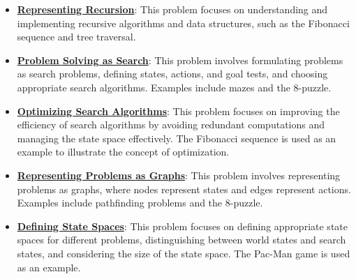 \documentclass{article}%
\begin{document}
\begin{itemize}[leftmargin=*]%
\item \href{https://purdue.brightspace.com/d2l/common/assets/pdfjs-d2l-dist/1.0.14-legacy/web/viewer.html?file=%2Fcontent%2Fenforced%2F1095467-wl.202510.CS.24300.001%2F14L1-DepthFS.pdf%3Fou%3D1095467&lang=en-us&container=d2l-fileviewer-rendered-pdf&fullscreen=d2l-fileviewer-rendered-pdf-dialog&height=667#page=3}{\textbf{Representing Recursion}}: This problem focuses on understanding and implementing recursive algorithms and data structures, such as the Fibonacci sequence and tree traversal.%
\item \href{https://purdue.brightspace.com/d2l/common/assets/pdfjs-d2l-dist/1.0.14-legacy/web/viewer.html?file=%2Fcontent%2Fenforced%2F1095467-wl.202510.CS.24300.001%2F14L1-DepthFS.pdf%3Fou%3D1095467&lang=en-us&container=d2l-fileviewer-rendered-pdf&fullscreen=d2l-fileviewer-rendered-pdf-dialog&height=667#page=12}{\textbf{Problem Solving as Search}}: This problem involves formulating problems as search problems, defining states, actions, and goal tests, and choosing appropriate search algorithms. Examples include mazes and the 8-puzzle.%
\item \href{https://purdue.brightspace.com/d2l/common/assets/pdfjs-d2l-dist/1.0.14-legacy/web/viewer.html?file=%2Fcontent%2Fenforced%2F1095467-wl.202510.CS.24300.001%2F14L1-DepthFS.pdf%3Fou%3D1095467&lang=en-us&container=d2l-fileviewer-rendered-pdf&fullscreen=d2l-fileviewer-rendered-pdf-dialog&height=667#page=21}{\textbf{Optimizing Search Algorithms}}: This problem focuses on improving the efficiency of search algorithms by avoiding redundant computations and managing the state space effectively. The Fibonacci sequence is used as an example to illustrate the concept of optimization.%
\item \href{https://purdue.brightspace.com/d2l/common/assets/pdfjs-d2l-dist/1.0.14-legacy/web/viewer.html?file=%2Fcontent%2Fenforced%2F1095467-wl.202510.CS.24300.001%2F14L1-DepthFS.pdf%3Fou%3D1095467&lang=en-us&container=d2l-fileviewer-rendered-pdf&fullscreen=d2l-fileviewer-rendered-pdf-dialog&height=667#page=25}{\textbf{Representing Problems as Graphs}}: This problem involves representing problems as graphs, where nodes represent states and edges represent actions. Examples include pathfinding problems and the 8-puzzle.%
\item \href{https://purdue.brightspace.com/d2l/common/assets/pdfjs-d2l-dist/1.0.14-legacy/web/viewer.html?file=%2Fcontent%2Fenforced%2F1095467-wl.202510.CS.24300.001%2F14L1-DepthFS.pdf%3Fou%3D1095467&lang=en-us&container=d2l-fileviewer-rendered-pdf&fullscreen=d2l-fileviewer-rendered-pdf-dialog&height=667#page=37}{\textbf{Defining State Spaces}}: This problem focuses on defining appropriate state spaces for different problems, distinguishing between world states and search states, and considering the size of the state space. The Pac-Man game is used as an example.%

\end{itemize}
\end{document}

